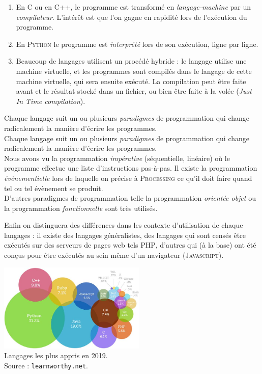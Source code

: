 \begin{enumerate}[--]
    \item   En \textsc{C} ou en \textsc{C++}, le programme est transformé en \textit{langage-machine} par un \textit{compilateur}. L'intérêt est que l'on gagne en rapidité lors de l'exécution du programme.
    \item   En \textsc{Python} le programme est \textit{interprété}  lors de son exécution, ligne par ligne.
    \item   Beaucoup de langages utilisent un procédé hybride : le langage utilise une machine virtuelle, et les programmes sont compilés dans le langage de cette machine virtuelle, qui sera ensuite exécuté. La compilation peut être faite avant et le résultat stocké dans un fichier, ou bien être faite à la volée (\textit{Just In Time compilation}).
\end{enumerate}



Chaque langage suit un ou plusieurs \textit{paradigmes} de programmation qui change radicalement la manière d'écrire les programmes.\\
Chaque langage suit un ou plusieurs \textit{paradigmes} de programmation qui change radicalement la manière d'écrire les programmes.\\
Nous avons vu la programmation \textit{impérative} (séquentielle, linéaire) où le programme effectue une liste d'instructions pas-à-pas. Il existe la programmation \textit{évènementielle} lors de laquelle on précise à \textsc{Processing} ce qu'il doit faire quand tel ou tel évènement se produit.\\
D'autres paradigmes de programmation telle la programmation \textit{orientée objet} ou la programmation \textit{fonctionnelle} sont très utilisés.

Enfin on distinguera des différences dans les contexte d'utilisation de chaque langages : il existe des langages généralistes, des langages qui sont censés être exécutés sur des \og serveurs de pages web\fg{} tels \textsc{PHP}, d'autres qui (à la base) ont été conçus pour être exécutés au sein même d'un navigateur (\textsc{Javascript}).

\begin{center}
    \includegraphics[width=7cm]{img/languages.png}\\ \scriptsize   Langages les plus appris en 2019.\\
    Source : \texttt{learnworthy.net}.
\end{center}
